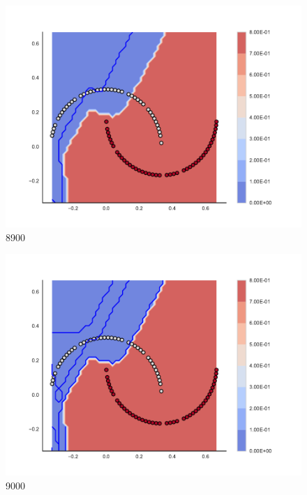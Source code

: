 \begin{subfigure}[b]{0.09\textwidth}
    \includegraphics[clip, trim=2.35cm 1.75cm 4.5cm 0cm,width=\textwidth]{img/convergence/8900.pdf}
    \caption{8900}
    \label{fig:convergence_8900}
\end{subfigure}
%
\begin{subfigure}[b]{0.09\textwidth}
    \includegraphics[clip, trim=2.35cm 1.75cm 4.5cm 0cm,width=\textwidth]{img/convergence/9000.pdf}
    \caption{9000}
    \label{fig:convergence_9000}
\end{subfigure}
%
